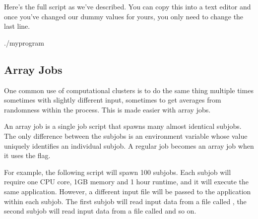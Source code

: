 \documentclass[letterpaper,10pt,english]{sphinxmanual}
\begin{document}
Here’s the full script as we’ve described. You can copy this into a text editor and once you’ve changed our dummy values for yours, you only need to change the last line.

\begin{sphinxVerbatim}[commandchars=\\\{\}]


 

./myprogram
\end{sphinxVerbatim}


\subsection{Array Jobs}
\label{\detokenize{using_katana/running_jobs:array-jobs}}\label{\detokenize{using_katana/running_jobs:id2}}
One common use of computational clusters is to do the same thing multiple times \sphinxhyphen{} sometimes with slightly different input, sometimes to get averages from randomness within the process. This is made easier with array jobs.

An array job is a single job script that spawns many almost identical sub\sphinxhyphen{}jobs. The only difference between the sub\sphinxhyphen{}jobs is an environment variable  whose value uniquely identifies an individual sub\sphinxhyphen{}job. A regular job becomes an array job when it uses the  flag.

For example, the following script will spawn 100 sub\sphinxhyphen{}jobs. Each sub\sphinxhyphen{}job will require one CPU core, 1GB memory and 1 hour run\sphinxhyphen{}time, and it will execute the same application. However, a different input file will be passed to the application within each sub\sphinxhyphen{}job. The first sub\sphinxhyphen{}job will read input data from a file called , the second sub\sphinxhyphen{}job will read input data from a file called  and so on.
\end{document}
